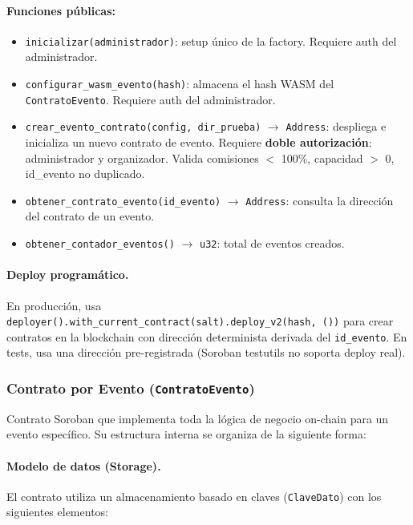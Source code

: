 \documentclass[12pt,oneside]{article}
\begin{document}
\paragraph{Funciones públicas:}
\begin{itemize}
  \item \texttt{inicializar(administrador)}: setup único de la factory. Requiere auth del administrador.
  \item \texttt{configurar\_wasm\_evento(hash)}: almacena el hash WASM del \texttt{ContratoEvento}. Requiere auth del administrador.
  \item \texttt{crear\_evento\_contrato(config, dir\_prueba)} $\rightarrow$ \texttt{Address}: despliega e inicializa un nuevo contrato de evento. Requiere \textbf{doble autorización}: administrador y organizador. Valida comisiones $<$ 100\%, capacidad $>$ 0, id\_evento no duplicado.
  \item \texttt{obtener\_contrato\_evento(id\_evento)} $\rightarrow$ \texttt{Address}: consulta la dirección del contrato de un evento.
  \item \texttt{obtener\_contador\_eventos()} $\rightarrow$ \texttt{u32}: total de eventos creados.
\end{itemize}

\paragraph{Deploy programático.} En producción, usa \texttt{deployer().with\_current\_contract(salt).deploy\_v2(hash, ())} para crear contratos en la blockchain con dirección determinista derivada del \texttt{id\_evento}. En tests, usa una dirección pre-registrada (Soroban testutils no soporta deploy real).

\subsubsection{Contrato por Evento (\texttt{ContratoEvento})}

Contrato Soroban que implementa toda la lógica de negocio on-chain para un evento específico. Su estructura interna se organiza de la siguiente forma:

\paragraph{Modelo de datos (Storage).} El contrato utiliza un almacenamiento basado en claves (\texttt{ClaveDato}) con los siguientes elementos:
\end{document}
